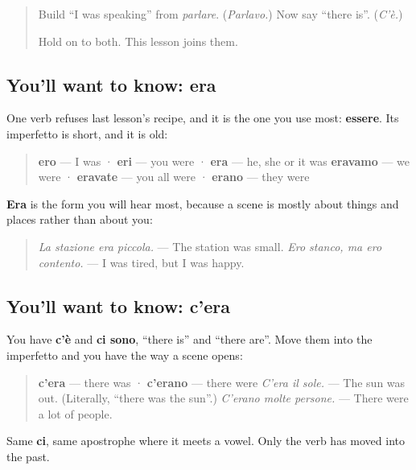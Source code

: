 \label{lesson:IT-C263-era}



\begin{quote}
Build \textquotedblleft{}I was speaking\textquotedblright{} from \emph{parlare}. (\emph{Parlavo.}) Now say \textquotedblleft{}there is\textquotedblright{}. (\emph{C'è.})

Hold on to both. This lesson joins them.
\end{quote}

\subsection*{You'll want to know: era}
One verb refuses last lesson's recipe, and it is the one you use most: \textbf{essere}. Its imperfetto is short, and it is old:

\begin{quote}
\textbf{ero} — I was · \textbf{eri} — you were · \textbf{era} — he, she or it was \textbf{eravamo} — we were · \textbf{eravate} — you all were · \textbf{erano} — they were
\end{quote}

\textbf{Era} is the form you will hear most, because a scene is mostly about things and places rather than about you:

\begin{quote}
\emph{La stazione era piccola.} — The station was small. \emph{Ero stanco, ma ero contento.} — I was tired, but I was happy.
\end{quote}

\subsection*{You'll want to know: c'era}
You have \textbf{c'è} and \textbf{ci sono}, \textquotedblleft{}there is\textquotedblright{} and \textquotedblleft{}there are\textquotedblright{}. Move them into the imperfetto and you have the way a scene opens:

\begin{quote}
\textbf{c'era} — there was · \textbf{c'erano} — there were \emph{C'era il sole.} — The sun was out. (Literally, \textquotedblleft{}there was the sun\textquotedblright{}.) \emph{C'erano molte persone.} — There were a lot of people.
\end{quote}

Same \textbf{ci}, same apostrophe where it meets a vowel. Only the verb has moved into the past.

